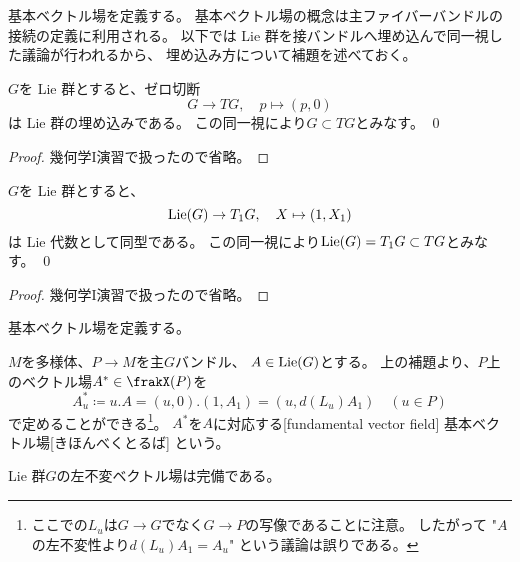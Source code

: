 \documentclass[report]{jlreq}
\begin{document}
基本ベクトル場を定義する。
基本ベクトル場の概念は主ファイバーバンドルの接続の定義に利用される。
以下では Lie 群を接バンドルへ埋め込んで同一視した議論が行われるから、
埋め込み方について補題を述べておく。

\begin{lemma}
    $G$を Lie 群とすると、ゼロ切断
    \begin{equation}
        G \to TG,
        \quad
        p \mapsto (p, 0)
    \end{equation}
    は Lie 群の埋め込みである。
    この同一視により$G \subset TG$とみなす。
    \qed
\end{lemma}

\begin{proof}
    幾何学I演習で扱ったので省略。
\end{proof}

\begin{lemma}
    $G$を Lie 群とすると、
    \begin{equation}
        \operatorname{Lie}(G) \to T_1G,
        \quad
        X \mapsto (1, X_1)
    \end{equation}
    は Lie 代数として同型である。
    この同一視により$\operatorname{Lie}(G) = T_1G \subset TG$とみなす。
    \qed
\end{lemma}

\begin{proof}
    幾何学I演習で扱ったので省略。
\end{proof}

基本ベクトル場を定義する。

\begin{definition}[基本ベクトル場]
    $M$を多様体、$P \to M$を主$G$バンドル、
    $A \in \operatorname{Lie}(G)$とする。
    上の補題より、$P$上のベクトル場$A^* \in \frakX(P)$を
    \begin{equation}
        A^*_u \coloneqq u . A = (u, 0) . (1, A_1) = (u, d(L_u) A_1)
        \quad (u \in P)
    \end{equation}
    で定めることができる\footnote{
        ここでの$L_u$は$G \to G$でなく$G \to P$の写像であることに注意。
        したがって "$A$の左不変性より$d(L_u) A_1 = A_u$" という議論は誤りである。
    }。
    $A^*$を$A$に対応する[fundamental vector field]
    {基本ベクトル場}[きほんべくとるば]
    という。
\end{definition}

\begin{lemma}[左不変ベクトル場は完備]
    Lie 群$G$の左不変ベクトル場は完備である。
\end{lemma}
\end{document}
